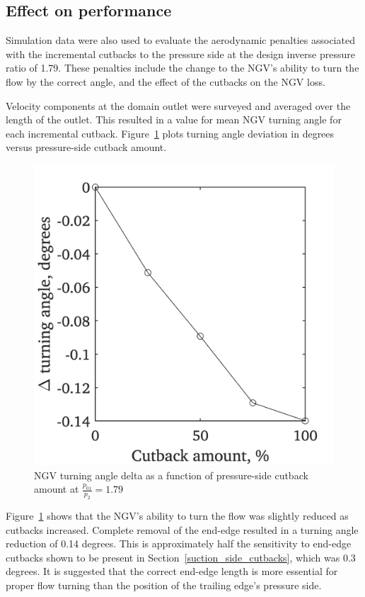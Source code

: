 \documentclass[a4paper, 11pt, oneside]{report}
\begin{document}
\subsection{Effect on performance}




Simulation data were also used to evaluate the aerodynamic penalties associated with the incremental cutbacks to the pressure side at the design inverse pressure ratio of 1.79. These penalties include the change to the NGV's ability to turn the flow by the correct angle, and the effect of the cutbacks on the NGV loss.

Velocity components at the domain outlet were surveyed and averaged over the length of the outlet. This resulted in a value for mean NGV turning angle for each incremental cutback. Figure~\ref{fig:ps_cutbacks_vs_turning_angles} plots turning angle deviation in degrees versus pressure-side cutback amount.

\begin{figure}[H]
	\centering
	\includegraphics[width=.45\textwidth]{figs/ps_cutbacks_vs_turning_angles.png}
	\caption{NGV turning angle delta as a function of pressure-side cutback amount at $\frac{p_{01}}{p_2}=1.79$}
    \label{fig:ps_cutbacks_vs_turning_angles}
\end{figure}

Figure~\ref{fig:ps_cutbacks_vs_turning_angles} shows that the NGV's ability to turn the flow was slightly reduced as cutbacks increased. Complete removal of the end-edge resulted in a turning angle reduction of 0.14 degrees. This is approximately half the sensitivity to end-edge cutbacks shown to be present in Section~\ref{suction_side_cutbacks}, which was 0.3 degrees. It is suggested that the correct end-edge length is more essential for proper flow turning than the position of the trailing edge's pressure side.
\end{document}
